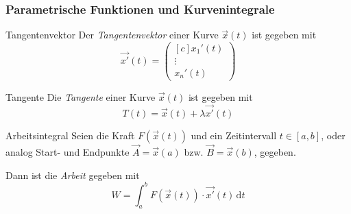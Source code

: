 \documentclass[german]{../spicker}
\newcommand{\vektor}[1]{\begin{pmatrix*}[c] #1 \end{pmatrix*}}
\renewcommand{\d}{\,\mathrm{d}}
\newcommand{\interval}[1]{\left[ #1 \right]}
\begin{document}
\subsubsection{Parametrische Funktionen und Kurvenintegrale}

\begin{defi}{Tangentenvektor}
    Der \emph{Tangentenvektor} einer Kurve $\vec{x}(t)$ ist gegeben mit
    $$
        \vec{x'}(t) = \vektor{x_1'(t) \\ \vdots \\ x_n'(t)}
    $$
\end{defi}

\begin{defi}{Tangente}
    Die \emph{Tangente} einer Kurve $\vec{x}(t)$ ist gegeben mit
    $$
        T(t) = \vec{x}(t) + \lambda\vec{x'}(t)
    $$
\end{defi}

\begin{defi}{Arbeitsintegral}
    Seien die Kraft $F(\vec{x}(t))$ und ein Zeitintervall $t \in \interval{a,b}$, oder analog Start- und Endpunkte $\vec{A} = \vec{x}(a)$ bzw. $\vec{B} = \vec{x}(b)$, gegeben.

    Dann ist die \emph{Arbeit} gegeben mit
    $$
        W = \int^b_a F(\vec{x}(t)) \cdot \vec{x'}(t) \d t
    $$
\end{defi}
\end{document}
